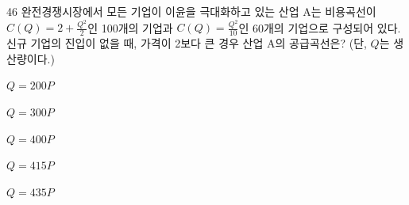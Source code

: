 \begin{question}{46}
완전경쟁시장에서 모든 기업이 이윤을 극대화하고 있는 산업 A는 비용곡선이 $C(Q)=2+\frac{Q^{2}}{2}$인 100개의 기업과 $C(Q)=\frac{Q^{2}}{10}$인 60개의 기업으로 구성되어 있다. 신규 기업의 진입이 없을 때, 가격이 2보다 큰 경우 산업 A의 공급곡선은? (단, $Q$는 생산량이다.)
\begin{choices}
  \item $Q=200P$
  \item $Q=300P$
  \item $Q=400P$
  \item $Q=415P$
  \item $Q=435P$
\end{choices}
\end{question}
